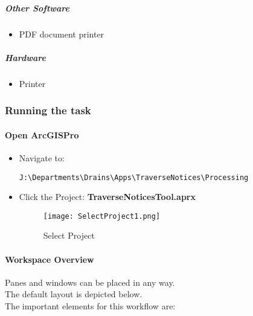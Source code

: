 \subparagraph{Other Software}

\begin{itemize}

\item PDF document printer

\end{itemize}

\subparagraph{Hardware}

\begin{itemize}

\item Printer

\end{itemize}

\clearpage


\subsubsection{Running the task}


\paragraph{Open ArcGISPro}

\begin{itemize}

\item Navigate to: \begin{verbatim}J:\Departments\Drains\Apps\TraverseNotices\Processing\end{verbatim}

\item Click the Project: \textbf{TraverseNoticesTool.aprx}
\begin{figure}[h!]
 \centering
     \texttt{[image: SelectProject1.png]}
 \caption{Select Project}
 \end{figure}

\end{itemize}
\clearpage

\paragraph{Workspace Overview}


\noindent Panes and windows can be placed in any way.\\
\noindent The default layout is depicted below. \\ 
\noindent The important elements for this workflow are:


